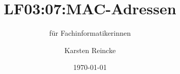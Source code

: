 \documentclass[]{beamer}
\title{LF03:07:MAC-Adressen}
\subtitle{für Fachinformatikerinnen}
\institute{GS-LDK}
\author{Karsten Reincke}
\date{\today}
\def\cfgGl{../../../cfg.gl/}
\begin{document}

\begin{frame}
  \titlepage
\end{frame}






\logo{}
\newpage



%
\end{document}
